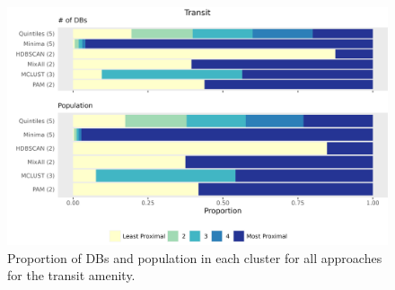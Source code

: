 \documentclass[11pt, a4paper]{article}
\begin{document}
\begin{figure}[H]
\centering
\includegraphics[width=\textwidth]{./barplot_comparison/Transit_barplot.png}
\caption[Transit profile barplot]{Proportion of DBs and population in each cluster for all approaches for the transit amenity.}\label{transitbarplot}
\end{figure}




\centering
\begin{table}[H]
\centering
\caption[Transit validation metrics]{The validation metric values for each clustering approach for the transit amenity.}\label{transitvalid}
\end{table}
\end{document}
